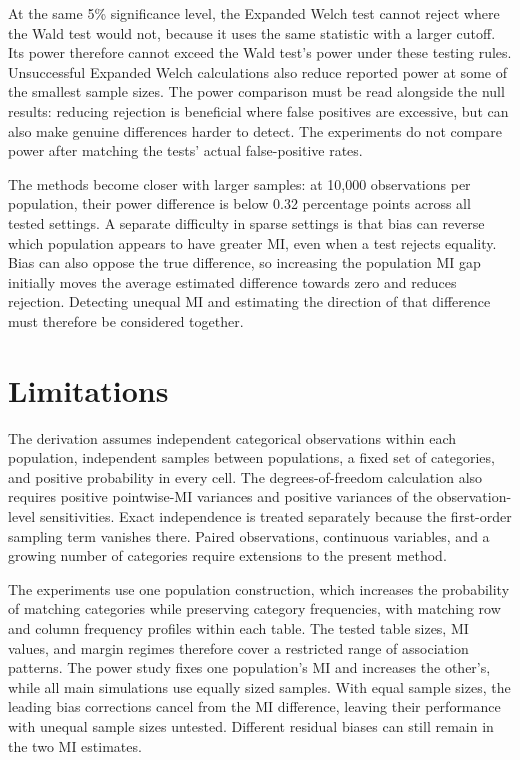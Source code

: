 At the same 5\% significance level, the Expanded Welch test cannot reject
where the Wald test would not, because it uses the same statistic with a
larger cutoff. Its power therefore cannot exceed the Wald test's power
under these testing rules. Unsuccessful Expanded Welch calculations also
reduce reported power at some of the smallest sample sizes. The power
comparison must be read alongside the null results: reducing rejection is
beneficial where false positives are excessive, but can also make genuine
differences harder to detect. The experiments do not compare power after
matching the tests' actual false-positive rates.

The methods become closer with larger samples: at 10,000 observations per
population, their power difference is below 0.32 percentage points across
all tested settings. A separate difficulty in sparse settings is
that bias can reverse which population appears to have greater MI, even
when a test rejects equality. Bias can also oppose the true difference,
so increasing the population MI gap initially moves the average estimated
difference towards zero and reduces rejection. Detecting unequal MI and
estimating the direction of that difference must therefore be considered
together.

\section{Limitations}

The derivation assumes independent categorical observations within each
population, independent samples between populations, a fixed set of
categories, and positive probability in every cell. The degrees-of-freedom
calculation also requires positive pointwise-MI variances and positive
variances of the observation-level sensitivities. Exact independence is
treated separately because the first-order sampling term vanishes there.
Paired observations, continuous variables, and a growing number of
categories require extensions to the present method.

The experiments use one population construction, which increases the
probability of matching categories while preserving category frequencies,
with matching row and column frequency profiles within each table. The tested table sizes, MI values, and
margin regimes therefore cover a restricted range of association patterns.
The power study fixes one population's MI and increases the other's, while
all main simulations use equally sized samples. With equal sample sizes,
the leading bias corrections cancel from the MI difference, leaving their
performance with unequal sample sizes untested. Different residual biases
can still remain in the two MI estimates.


